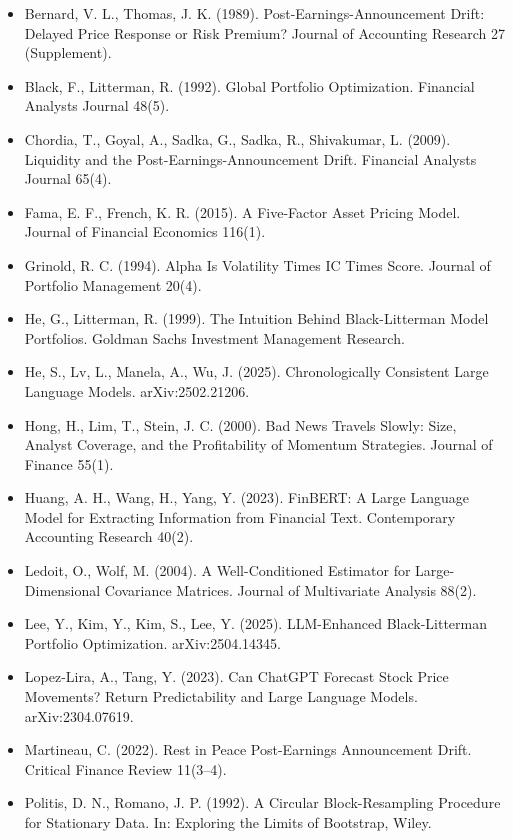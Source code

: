\documentclass[xelatex,ja=standard,jafont=haranoaji,a4paper,10pt]{bxjsreport}
\begin{document}
\begin{itemize}\small
\item Bernard, V. L., Thomas, J. K. (1989). Post-Earnings-Announcement Drift: Delayed Price Response or Risk Premium? Journal of Accounting Research 27 (Supplement).
\item Black, F., Litterman, R. (1992). Global Portfolio Optimization. Financial Analysts Journal 48(5).
\item Chordia, T., Goyal, A., Sadka, G., Sadka, R., Shivakumar, L. (2009). Liquidity and the Post-Earnings-Announcement Drift. Financial Analysts Journal 65(4).
\item Fama, E. F., French, K. R. (2015). A Five-Factor Asset Pricing Model. Journal of Financial Economics 116(1).
\item Grinold, R. C. (1994). Alpha Is Volatility Times IC Times Score. Journal of Portfolio Management 20(4).
\item He, G., Litterman, R. (1999). The Intuition Behind Black-Litterman Model Portfolios. Goldman Sachs Investment Management Research.
\item He, S., Lv, L., Manela, A., Wu, J. (2025). Chronologically Consistent Large Language Models. arXiv:2502.21206.
\item Hong, H., Lim, T., Stein, J. C. (2000). Bad News Travels Slowly: Size, Analyst Coverage, and the Profitability of Momentum Strategies. Journal of Finance 55(1).
\item Huang, A. H., Wang, H., Yang, Y. (2023). FinBERT: A Large Language Model for Extracting Information from Financial Text. Contemporary Accounting Research 40(2).
\item Ledoit, O., Wolf, M. (2004). A Well-Conditioned Estimator for Large-Dimensional Covariance Matrices. Journal of Multivariate Analysis 88(2).
\item Lee, Y., Kim, Y., Kim, S., Lee, Y. (2025). LLM-Enhanced Black-Litterman Portfolio Optimization. arXiv:2504.14345.
\item Lopez-Lira, A., Tang, Y. (2023). Can ChatGPT Forecast Stock Price Movements? Return Predictability and Large Language Models. arXiv:2304.07619.
\item Martineau, C. (2022). Rest in Peace Post-Earnings Announcement Drift. Critical Finance Review 11(3--4).
\item Politis, D. N., Romano, J. P. (1992). A Circular Block-Resampling Procedure for Stationary Data. In: Exploring the Limits of Bootstrap, Wiley.
\end{itemize}
\end{document}

